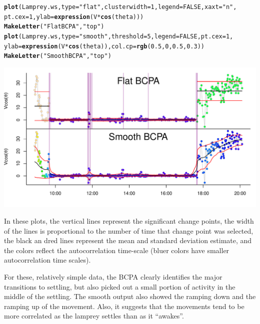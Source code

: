 \documentclass[10pt]{article}\usepackage{graphicx, color}
\makeatletter
\newcommand{\hlfunctioncall}[1]{\textcolor[rgb]{0.501960784313725,0,0.329411764705882}{\textbf{#1}}}%
\newcommand{\hlstring}[1]{\textcolor[rgb]{0.6,0.6,1}{#1}}%
\newenvironment{kframe}{%
 \def\at@end@of@kframe{}%
 \ifinner\ifhmode%
  \def\at@end@of@kframe{\end{minipage}}%
  \begin{minipage}{\columnwidth}%
 \fi\fi%
 \def\FrameCommand##1{\hskip\@totalleftmargin \hskip-\fboxsep
 \colorbox{shadecolor}{##1}\hskip-\fboxsep
     \hskip-\linewidth \hskip-\@totalleftmargin \hskip\columnwidth}%
 \MakeFramed {\advance\hsize-\width
   \@totalleftmargin\z@ \linewidth\hsize
   \@setminipage}}%
 {\par\unskip\endMakeFramed%
 \at@end@of@kframe}
\newenvironment{knitrout}{}{} %
\makeatother
\begin{document}
\begin{knitrout}\small
{}\color{fgcolor}\begin{kframe}
\begin{alltt}
\hlfunctioncall{plot}(Lamprey.ws, type = \hlstring{"flat"}, clusterwidth = 1, legend = FALSE, xaxt = \hlstring{"n"}, 
    pt.cex = 1, ylab = \hlfunctioncall{expression}(V * \hlfunctioncall{cos}(theta)))
\hlfunctioncall{MakeLetter}(\hlstring{"Flat BCPA"}, \hlstring{"top"})
\hlfunctioncall{plot}(Lamprey.ws, type = \hlstring{"smooth"}, threshold = 5, legend = FALSE, pt.cex = 1, 
    ylab = \hlfunctioncall{expression}(V * \hlfunctioncall{cos}(theta)), col.cp = \hlfunctioncall{rgb}(0.5, 0, 0.5, 0.3))
\hlfunctioncall{MakeLetter}(\hlstring{"Smooth BCPA"}, \hlstring{"top"})
\end{alltt}
\end{kframe}
\includegraphics[width=\textwidth]{figure/BCPAsegments} 

\end{knitrout}


In these plots, the vertical lines represent the significant change points, the width of the lines is proportional to the number of time that change point was selected, the black an dred lines represent the mean and standard deviation estimate, and the colors reflect the autocorrelation time-scale (bluer colors have smaller autocorrelation time scales).

For these, relatively simple data, the BCPA clearly identifies the major transitions to settling, but also picked out a small portion of activity in the middle of the settling.  The smooth output also showed the ramping down and the ramping up of the movement.  Also, it suggests that the movements tend to be more correlated as the lamprey settles than as it ``awakes''.
\end{document}
